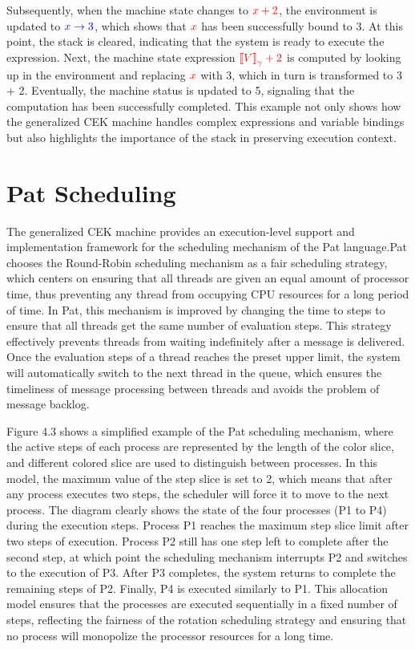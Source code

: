 \documentclass{l4proj}
\begin{document}
Subsequently, when the machine state changes to $\color{red}x + 2$, the environment is updated to $\color{blue}x \rightarrow 3$, which shows that $\color{red}x$ has been successfully bound to {\color{red}3}. At this point, the stack is cleared, indicating that the system is ready to execute the expression. Next, the machine state expression $\color{red}\text{\textlbrackdbl} V \text{\textrbrackdbl}_{\gamma} + 2$ is computed by looking up in the environment and replacing $\color{red}x$ with {\color{red}3}, which in turn is transformed to {\color{red}3} + {\color{red}2}. Eventually, the machine status is updated to {\color{red}5}, signaling that the computation has been successfully completed. This example not only shows how the generalized CEK machine handles complex expressions and variable bindings but also highlights the importance of the stack in preserving execution context.

\section{Pat Scheduling}
The generalized CEK machine provides an execution-level support and implementation framework for the scheduling mechanism of the Pat language.Pat chooses the Round-Robin scheduling mechanism as a fair scheduling strategy, which centers on ensuring that all threads are given an equal amount of processor time, thus preventing any thread from occupying CPU resources for a long period of time. In Pat, this mechanism is improved by changing the time to steps to ensure that all threads get the same number of evaluation steps. This strategy effectively prevents threads from waiting indefinitely after a message is delivered. Once the evaluation steps of a thread reaches the preset upper limit, the system will automatically switch to the next thread in the queue, which ensures the timeliness of message processing between threads and avoids the problem of message backlog.

Figure 4.3 shows a simplified example of the Pat scheduling mechanism, where the active steps of each process are represented by the length of the color slice, and different colored slice are used to distinguish between processes. In this model, the maximum value of the step slice is set to 2, which means that after any process executes two steps, the scheduler will force it to move to the next process. The diagram clearly shows the state of the four processes (P1 to P4) during the execution steps. Process P1 reaches the maximum step slice limit after two steps of execution. Process P2 still has one step left to complete after the second step, at which point the scheduling mechanism interrupts P2 and switches to the execution of P3. After P3 completes, the system returns to complete the remaining steps of P2. Finally, P4 is executed similarly to P1. This allocation model ensures that the processes are executed sequentially in a fixed number of steps, reflecting the fairness of the rotation scheduling strategy and ensuring that no process will monopolize the processor resources for a long time.
\end{document}
